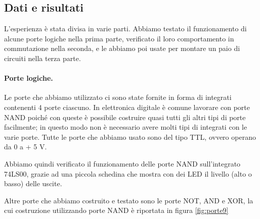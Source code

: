 \subsection{Dati e risultati}

L'esperienza è stata divisa in varie parti. Abbiamo testato il funzionamento
di alcune porte logiche nella prima parte, verificato il loro comportamento
in commutazione nella seconda, e le abbiamo poi usate per montare un paio di
circuiti nella terza parte.

\paragraph{Porte logiche.}

Le porte che abbiamo utilizzato ci sono state fornite in forma di integrati contenenti
4 porte ciascuno. In elettronica digitale è comune lavorare con porte NAND poiché con
queste è possibile costruire quasi tutti gli altri tipi di porte facilmente; in questo
modo non è necessario avere molti tipi di integrati con le varie porte. Tutte le 
porte che abbiamo usato sono del tipo TTL, ovvero operano da 0 a + 5 V.

Abbiamo quindi verificato il funzionamento delle porte NAND sull'integrato 74LS00,
grazie ad una piccola schedina che mostra con dei LED il livello (alto o basso)
delle uscite.

Altre porte che abbiamo costruito e testato sono le porte NOT, AND e XOR,
la cui costruzione utilizzando porte NAND è riportata in figura \ref{fig:porte9}

